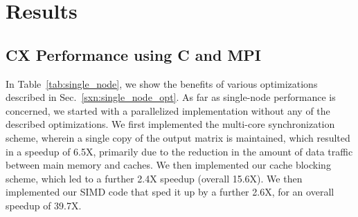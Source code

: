 \section{Results}
\label{sec:results}



\subsection{CX Performance using C and MPI} %
  \label{sxn:results1}


   

      In Table~\ref{tab:single_node}, we show the benefits of various
      optimizations described in
      Sec.~\ref{sxn:single_node_opt}. 
      As far as single-node performance is concerned, we started with a parallelized implementation  
      without any of the described optimizations. %
      We first implemented the multi-core synchronization scheme, wherein a single copy of the
      output matrix is maintained, %
      which resulted in a speedup of 6.5X, primarily due to
      the reduction in the amount of data traffic between 
      main memory and caches. 
      We then implemented our cache blocking scheme, which led to a
      further  2.4X speedup (overall 15.6X).
      We then implemented our SIMD code that sped it up by a further
      2.6X, for an overall speedup of 39.7X. 






